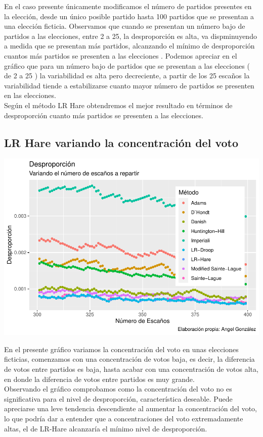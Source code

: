 \documentclass[12pt,a4paper,]{book}
\numberwithin{dummy}{section}
\theoremstyle{ocrenumbox}
\theoremstyle{blacknumex}
\theoremstyle{blacknumbox}
\theoremstyle{ocrenum}
\theoremstyle{ocrenum}
\begin{document}
En el caso presente únicamente modificamos el número de partidos
presentes en la elección, desde un único posible partido hasta 100
partidos que se presentan a una elección ficticia. Observamos que cuando
se presentan un número bajo de partidos a las elecciones, entre 2 a 25,
la desproporción es alta, va dispminuyendo a medida que se presentan más
partidos, alcanzando el mínimo de desproporción cuantos más partidos se
presenten a las elecciones . Podemos apreciar en el gráfico que para un
número bajo de partidos que se presentan a las elecciones ( de 2 a 25 )
la variabilidad es alta pero decreciente, a partir de los 25 escaños la
variabilidad tiende a estabilizarse cuanto mayor número de partidos se
presenten en las elecciones.\\
Según el método LR Hare obtendremos el mejor resultado en términos de
desproporción cuanto más partidos se presenten a las elecciones.

\hypertarget{lr-hare-variando-la-concentraciuxf3n-del-voto}{%
\subsection{LR Hare variando la concentración del
voto}\label{lr-hare-variando-la-concentraciuxf3n-del-voto}}

\begin{center}\includegraphics[width=0.95\linewidth]{figurasR/unnamed-chunk-50-1} \end{center}

En el presente gráfico variamos la concentración del voto en unas
elecciones ficticias, comenzamos con una concentración de votos baja, es
decir, la diferencia de votos entre partidos es baja, hasta acabar con
una concentración de votos alta, en donde la diferencia de votos entre
partidos es muy grande.\\
Observando el gráfico comprobamos como la concentración del voto no es
significativa para el nivel de desproporción, característica deseable.
Puede apreciarse una leve tendencia descendiente al aumentar la
concentración del voto, lo que podría dar a entender que a
concentraciones del voto extremadamente altas, el de LR-Hare alcanzaría
el mínimo nivel de desproporción.
\end{document}
